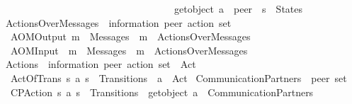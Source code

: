 \begin{isabellebody}
\ \ \ \ \ \ \ \ \ \ \ \ \ \ \ \ \ \ \ \ \ \ \ \ \ \ \ \ \ \ \ \ \ \ \ get{\isacharunderscore}{\kern0pt}object\ a\ {\isasymnoteq}\ peer\ {\isasymand}\ s{}\ {\isasymin}\ States{\isachardoublequoteclose}\isanewline
{}\isanewline
\isanewline
{}\isamarkupfalse%
\ ActionsOverMessages\ {\isacharcolon}{\kern0pt}{\isacharcolon}{\kern0pt}\ {\isachardoublequoteopen}{\isacharparenleft}{\kern0pt}{\isacharprime}{\kern0pt}information{\isacharcomma}{\kern0pt}\ {\isacharprime}{\kern0pt}peer{\isacharparenright}{\kern0pt}\ action\ set{\isachardoublequoteclose}\ \isanewline
\ \ AOMOutput{\isacharcolon}{\kern0pt}\ {\isachardoublequoteopen}m\ {\isasymin}\ Messages\ {\isasymLongrightarrow}\ {\isacharbang}{\kern0pt}{\isasymlangle}m{\isasymrangle}\ {\isasymin}\ ActionsOverMessages{\isachardoublequoteclose}\ {\isacharbar}{\kern0pt}\isanewline
\ \ AOMInput{\isacharcolon}{\kern0pt}\ \ {\isachardoublequoteopen}m\ {\isasymin}\ Messages\ {\isasymLongrightarrow}\ {\isacharquery}{\kern0pt}{\isasymlangle}m{\isasymrangle}\ {\isasymin}\ ActionsOverMessages{\isachardoublequoteclose}\isanewline
\isanewline
{}\isamarkupfalse%
\ Actions\ {\isacharcolon}{\kern0pt}{\isacharcolon}{\kern0pt}\ {\isachardoublequoteopen}{\isacharparenleft}{\kern0pt}{\isacharprime}{\kern0pt}information{\isacharcomma}{\kern0pt}\ {\isacharprime}{\kern0pt}peer{\isacharparenright}{\kern0pt}\ action\ set{\isachardoublequoteclose}\ \ {\isacharparenleft}{\kern0pt}{\isachardoublequoteopen}Act{\isachardoublequoteclose}{\isacharparenright}{\kern0pt}\ \isanewline
\ \ ActOfTrans{\isacharcolon}{\kern0pt}\ {\isachardoublequoteopen}{\isacharparenleft}{\kern0pt}s{}{\isacharcomma}{\kern0pt}\ a{\isacharcomma}{\kern0pt}\ s{}{\isacharparenright}{\kern0pt}\ {\isasymin}\ Transitions\ {\isasymLongrightarrow}\ a\ {\isasymin}\ Act{\isachardoublequoteclose}\isanewline
\isanewline
{}\isamarkupfalse%
\ CommunicationPartners\ {\isacharcolon}{\kern0pt}{\isacharcolon}{\kern0pt}\ {\isachardoublequoteopen}{\isacharprime}{\kern0pt}peer\ set{\isachardoublequoteclose}\ \isanewline
\ \ CPAction{\isacharcolon}{\kern0pt}\ {\isachardoublequoteopen}{\isacharparenleft}{\kern0pt}s{}{\isacharcomma}{\kern0pt}\ a{\isacharcomma}{\kern0pt}\ s{}{\isacharparenright}{\kern0pt}\ {\isasymin}\ Transitions\ {\isasymLongrightarrow}\ get{\isacharunderscore}{\kern0pt}object\ a\ {\isasymin}\ CommunicationPartners{\isachardoublequoteclose}\isanewline

\end{isabellebody}
